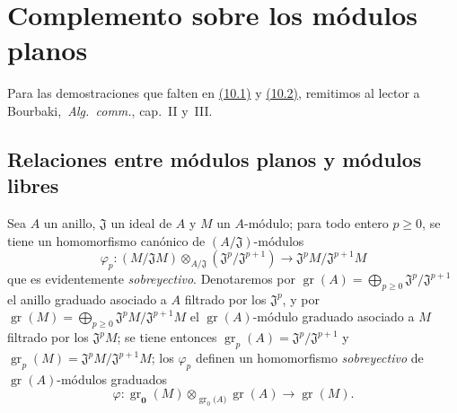 \section{Complemento sobre los módulos planos}
\label{section:0.10}
\label{section:0.10-fr}

Para las demostraciones que falten en \hyperref[subsection:0.10.1]{(10.1)} y \hyperref[subsection:0.10.2]{(10.2)}, remitimos al lector a Bourbaki,~\emph{Alg.~comm.}, cap.~II y~III.

\subsection{Relaciones entre módulos planos y módulos libres}
\label{subsection:0.10.1}
\label{subsection:0.10.1-fr}

\begin{env}[10.1.1]
\label{0.10.1.1}
\label{0.10.1.1-fr}
Sea $A$ un anillo, $\mathfrak{J}$ un ideal de $A$ y $M$ un $A$-módulo;
para todo entero $p\geq0$, se tiene un homomorfismo canónico de $(A/\mathfrak{J})$-módulos
\[
\label{0.10.1.1.1-fr}
  \varphi_p:(M/\mathfrak{J}M)\otimes_{A/\mathfrak{J}}
  (\mathfrak{J}^p/\mathfrak{J}^{p+1})
  \longrightarrow \mathfrak{J}^pM/\mathfrak{J}^{p+1}M
  \tag{10.1.1.1}
\]
que es evidentemente \emph{sobreyectivo}.
Denotaremos por $\operatorname{gr}(A)=\bigoplus_{p\geq0}\mathfrak{J}^p/\mathfrak{J}^{p+1}$ el anillo graduado asociado a $A$ filtrado por los $\mathfrak{J}^p$, y por $\operatorname{gr}(M)=\bigoplus_{p\geq0}\mathfrak{J}^pM/\mathfrak{J}^{p+1}M$ el $\operatorname{gr}(A)$-módulo graduado asociado a $M$ filtrado por los $\mathfrak{J}^pM$;
se tiene entonces $\operatorname{gr}_p(A)=\mathfrak{J}^p/\mathfrak{J}^{p+1}$ y $\operatorname{gr}_p(M)=\mathfrak{J}^pM/\mathfrak{J}^{p+1}M$;
los $\varphi_p$ definen un homomorfismo \emph{sobreyectivo} de $\operatorname{gr}(A)$-módulos graduados
\[
\label{0.10.1.1.2-fr}
  \varphi:\operatorname{gr}_{\mathbf{0}}(M)\otimes_{\operatorname{gr}_0(A\boldsymbol{)}}
  \operatorname{gr}(A)\longrightarrow\operatorname{gr}(M).
  \tag{10.1.1.2}
\]
\end{env}

